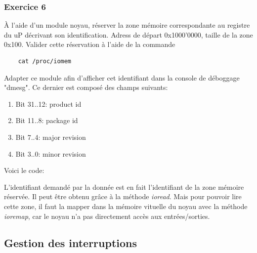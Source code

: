 \subsubsection{Exercice 6}
À l'aide d'un module noyau, réserver la zone mémoire correspondante au registre du uP décrivant son identification. Adress de départ 0x1000'0000, taille de la zone 0x100. Valider cette réservation à l'aide de la commande 
\begin{lstlisting}
	cat /proc/iomem
\end{lstlisting}
Adapter ce module afin d'afficher cet identifiant dans la console de déboggage "dmesg". Ce dernier est composé des champs suivants:
\begin{enumerate}
	\item Bit 31..12: product id
	\item Bit 11..8: package id
	\item Bit 7..4: major revision
	\item Bit 3..0: minor revision\\
\end{enumerate}

Voici le code:


L'identifiant demandé par la donnée est en fait l'identifiant de la zone mémoire réservée. Il peut être obtenu grâce à la méthode \textit{ioread}. Mais pour pouvoir lire cette zone, il faut la mapper dans la mémoire vituelle du noyau avec la méthode \textit{ioremap}, car le noyau n'a pas directement accès aux entrées/sorties.
	
\subsection{Gestion des interruptions}
